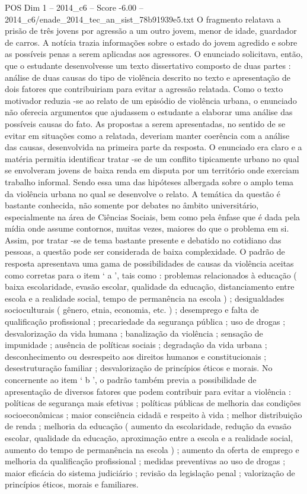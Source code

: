 \begin{textsample}{POS Dim 1 – 2014\_c6 – Score -6.00 – 2014\_c6/enade\_2014\_tec\_an\_sist\_78b91939e5.txt}
O fragmento relatava a prisão de três jovens por agressão a um outro jovem, menor de idade, guardador de carros.
A notícia trazia informações sobre o estado do jovem agredido e sobre as possíveis penas a serem aplicadas aos agressores.
O enunciado solicitava, então, que o estudante desenvolvesse um texto dissertativo composto de duas partes : análise de duas causas do tipo de violência descrito no texto e apresentação de dois fatores que contribuiriam para evitar a agressão relatada.
Como o texto motivador reduzia -se ao relato de um episódio de violência urbana, o enunciado não oferecia argumentos que ajudassem o estudante a elaborar uma análise das possíveis causas do fato.
As propostas a serem apresentadas, no sentido de se evitar em situações como a relatada, deveriam manter coerência com a análise das causas, desenvolvida na primeira parte da resposta.
O enunciado era claro e a matéria permitia identificar tratar -se de um conflito tipicamente urbano no qual se envolveram jovens de baixa renda em disputa por um território onde exerciam trabalho informal.
Sendo essa uma das hipóteses albergada sobre o amplo tema da violência urbana no qual se desenvolve o relato.
A temática da questão é bastante conhecida, não somente por debates no âmbito universitário, especialmente na área de Ciências Sociais, bem como pela ênfase que é dada pela mídia onde assume contornos, muitas vezes, maiores do que o problema em si.
Assim, por tratar -se de tema bastante presente e debatido no cotidiano das pessoas, a questão pode ser considerada de baixa complexidade.
O padrão de resposta apresentava uma gama de possibilidades de causas da violência aceitas como corretas para o item ‘ a ’, tais como : problemas relacionados à educação ( baixa escolaridade, evasão escolar, qualidade da educação, distanciamento entre escola e a realidade social, tempo de permanência na escola ) ; desigualdades socioculturais ( gênero, etnia, economia, etc. ) ; desemprego e falta de qualificação profissional ; precariedade da segurança pública ; uso de drogas ; desvalorização da vida humana ; banalização da violência ; sensação de impunidade ; ausência de políticas sociais ; degradação da vida urbana ; desconhecimento ou desrespeito aos direitos humanos e constitucionais ; desestruturação familiar ; desvalorização de princípios éticos e morais.
No concernente ao item ‘ b ’, o padrão também previa a possibilidade de apresentação de diversos fatores que podem contribuir para evitar a violência : políticas de segurança mais efetivas ; políticas públicas de melhoria das condições socioeconômicas ; maior consciência cidadã e respeito à vida ; melhor distribuição de renda ; melhoria da educação ( aumento da escolaridade, redução da evasão escolar, qualidade da educação, aproximação entre a escola e a realidade social, aumento do tempo de permanência na escola ) ; aumento da oferta de emprego e melhoria da qualificação profissional ; medidas preventivas ao uso de drogas ; maior eficácia do sistema judiciário ; revisão da legislação penal ; valorização de princípios éticos, morais e familiares.

\end{textsample}
